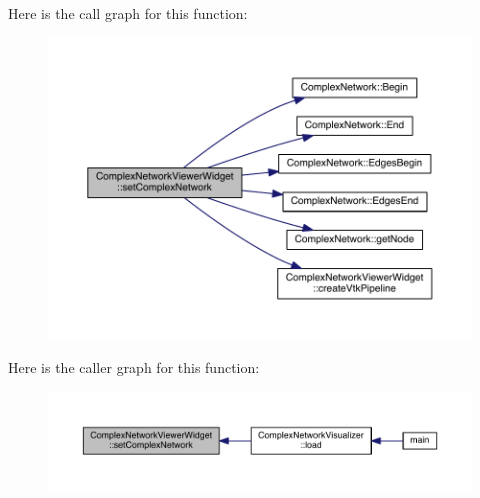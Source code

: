 Here is the call graph for this function\+:\nopagebreak
\begin{figure}[H]
\begin{center}
\leavevmode
\includegraphics[width=350pt]{class_complex_network_viewer_widget_aed1e7ad3c16aaf0d744a6eee287e94b8_cgraph}
\end{center}
\end{figure}




Here is the caller graph for this function\+:\nopagebreak
\begin{figure}[H]
\begin{center}
\leavevmode
\includegraphics[width=350pt]{class_complex_network_viewer_widget_aed1e7ad3c16aaf0d744a6eee287e94b8_icgraph}
\end{center}
\end{figure}




